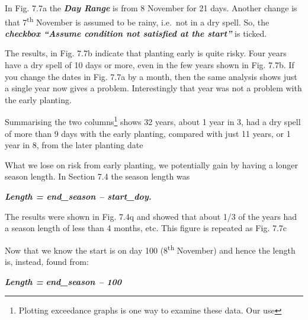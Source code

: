 \documentclass[
  letterpaper,
  DIV=11,
  numbers=noendperiod]{scrreprt}
\begin{document}
In Fig. 7.7a the \textbf{\emph{Day Range}} is from 8 November for 21
days. Another change is that 7\textsuperscript{th} November is assumed
to be rainy, i.e.~not in a dry spell. So, the \textbf{\emph{checkbox
``Assume condition not satisfied at the start''}} is ticked.

The results, in Fig. 7.7b indicate that planting early is quite risky.
Four years have a dry spell of 10 days or more, even in the few years
shown in Fig. 7.7b. If you change the dates in Fig. 7.7a by a month,
then the same analysis shows just a single year now gives a problem.
Interestingly that year was not a problem with the early planting.

Summarising the two columns\footnote{Plotting exceedance graphs is one
  way to examine these data. Our use} shows 32 years, about 1 year in 3,
had a dry spell of more than 9 days with the early planting, compared
with just 11 years, or 1 year in 8, from the later planting date

What we lose on risk from early planting, we potentially gain by having
a longer season length. In Section 7.4 the season length was

\textbf{\emph{Length = end\_season -- start\_doy.}}

The results were shown in Fig. 7.4q and showed that about 1/3 of the
years had a season length of less than 4 months, etc. This figure is
repeated as Fig. 7.7c

Now that we know the start is on day 100 (8\textsuperscript{th}
November) and hence the length is, instead, found from:

\textbf{\emph{Length =}} \textbf{\emph{end\_season -- 100}}
\end{document}
